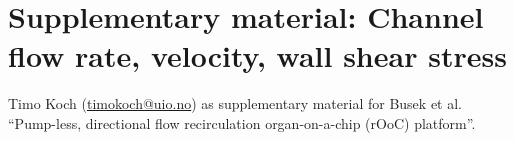 \documentclass{article}
\begin{document}


\section*{Supplementary material: Channel flow rate, velocity, wall shear stress}
Timo Koch (\url{timokoch@uio.no}) as supplementary material for Busek et al. ``Pump-less, directional flow recirculation organ-on-a-chip (rOoC) platform''.
\end{document}
